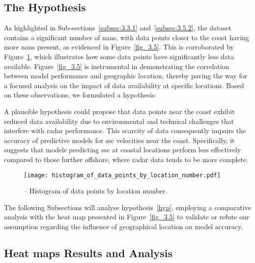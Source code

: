 \subsection{The Hypothesis}
\label{subsec:4.2.1}

As highlighted in Sub-sections~\ref{subsec:3.3.1} and~\ref{subsec:3.5.2}, the dataset contains a significant number of \acrshort{nan}s, with data points closer to the coast having more \acrshort{nan}s present, as evidenced in Figure~\ref{fig_3.5}. This is corroborated by Figure~\ref{fig_4.1}, which illustrates how some data points have significantly less data available. Figure~\ref{fig_3.5} is instrumental in demonstrating the correlation between model performance and geographic location, thereby paving the way for a focused analysis on the impact of data availability at specific locations. Based on these observations, we formulated a hypothesis:
\begin{hypothesis}
A plausible hypothesis could propose that data points near the coast exhibit reduced data availability due to environmental and technical challenges that interfere with radar performance. This scarcity of data consequently impairs the accuracy of predictive models for \acrshort{ssc} velocities near the coast. Specifically, it suggests that models predicting \acrshort{ssc} at coastal locations perform less effectively compared to those further offshore, where radar data tends to be more complete.
\label{hyp}
\end{hypothesis}

\begin{figure}[htbp]
    \centering
    \texttt{[image: histogram\_of\_data\_points\_by\_location\_number.pdf]}
    \caption[Histogram of data points by location number.]{-- Histogram of data points by location number.\label{fig_4.1}}
\end{figure}

The following Subsections will analyse hypothesis~\ref{hyp}, employing a comparative analysis with the heat map presented in Figure~\ref{fig_3.5} to validate or refute our assumption regarding the influence of geographical location on model accuracy.

\subsection{Heat maps Results and Analysis}
\label{subsec:4.2.2}

